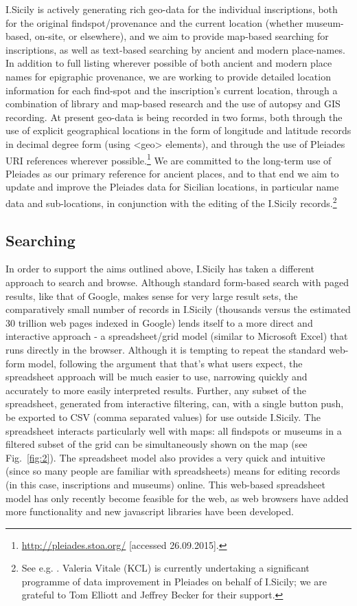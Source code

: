 \documentclass[amsthm,ebook]{saparticle}
\begin{document}
\noindent I.Sicily is actively generating rich geo-data for the individual inscriptions, both for the original findspot/provenance
and the current location (whether museum-based, on-site, or elsewhere), and we aim to provide map-based searching for
inscriptions, as well as text-based searching by ancient and modern place-names. In addition to full listing wherever
possible of both ancient and modern place names for epigraphic provenance, we are working to provide detailed location
information for each find-spot and the inscription’s current location, through a combination of library and map-based
research and the use of autopsy and GIS recording. At present geo-data is being recorded in two forms, both through the
use of explicit geographical locations in the form of longitude and latitude records in decimal degree form (using
{\textless}geo{\textgreater} elements), and through the use of Pleiades URI references wherever possible.\footnote{
\url{http://pleiades.stoa.org/} [accessed 26.09.2015].} We are committed to the long-term use of Pleiades as our primary
reference for ancient places, and to that end we aim to update and improve the Pleiades data for Sicilian locations, in
particular name data and sub-locations, in conjunction with the editing of the I.Sicily records.\footnote{ See e.g.
\citet{wilson_places:_2015}. Valeria Vitale (KCL) is currently undertaking a significant programme of data improvement in
Pleiades on behalf of I.Sicily; we are grateful to Tom Elliott and Jeffrey Becker for their support.}




\subsection{Searching}


\noindent In order to support the aims outlined above, I.Sicily has taken a different approach to search and browse. Although
standard form-based search with paged results, like that of Google, makes sense for very large result sets, the
comparatively small number of records in I.Sicily (thousands versus the estimated 30 trillion web pages indexed in
Google) lends itself to a more direct and interactive approach - a spreadsheet/grid model (similar to Microsoft Excel)
that runs directly in the browser. Although it is tempting to repeat the standard web-form model, following the
argument that that’s what users expect, the spreadsheet approach will be much easier to use, narrowing quickly and
accurately to more easily interpreted results. Further, any subset of the spreadsheet, generated from interactive
filtering, can, with a single button push, be exported to CSV (comma separated values) for use outside I.Sicily. The
spreadsheet interacts particularly well with maps: all findspots or museums in a filtered subset of the grid can be
simultaneously shown on the map (see Fig.~\ref{fig:2}). The spreadsheet model also provides a very quick and intuitive (since so
many people are familiar with spreadsheets) means for editing records (in this case, inscriptions and museums) online.
This web-based spreadsheet model has only recently become feasible for the web, as web browsers have added more
functionality and new javascript libraries have been developed.
\end{document}
